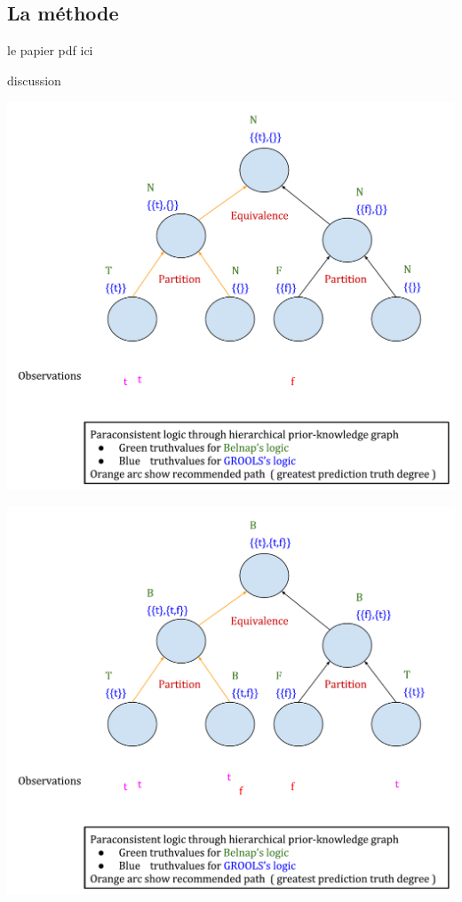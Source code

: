 \begin{refsegment}
\section{La méthode}
le papier
pdf ici

discussion

\begin{shadedfigure}
    \centering
    \includegraphics[width=\textwidth]{img/GROOLS_vs_belnap_1.pdf}
    \caption{  }
    \label{fig:grools_belnap_1}
\end{shadedfigure}

\begin{shadedfigure}
    \centering
    \includegraphics[width=\textwidth]{img/GROOLS_vs_belnap_2.pdf}
    \caption{  }
    \label{fig:grools_belnap_2}
\end{shadedfigure}

\subbibliography
\end{refsegment}